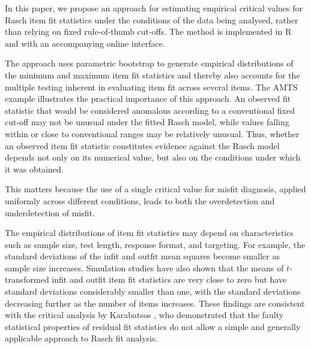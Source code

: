 \documentclass[11pt,a4paper]{article}
\begin{document}
In this paper, we propose an approach for estimating empirical critical values for Rasch item fit statistics under the conditions of the data being analysed, rather than relying on fixed rule-of-thumb cut-offs. 
The method is implemented in R and with an accompanying online interface.

The approach uses parametric bootstrap to generate empirical distributions of the minimum and maximum item fit statistics and thereby also accounts for the multiple testing inherent in evaluating item fit across several items. The AMTS example illustrates the practical importance of this approach. An observed fit statistic that would be considered anomalous according to a conventional fixed cut-off may not be unusual under the fitted Rasch model, while values falling within or close to conventional ranges may be relatively unusual. Thus, whether an observed item fit statistic constitutes evidence against the Rasch model depends not only on its numerical value, but also on the conditions under which it was obtained.

This matters because the use of a single critical value for misfit diagnosis, applied uniformly across different conditions, leads to both the overdetection and underdetection of misfit. 

The empirical distributions of item fit statistics may depend on characteristics such as sample size, test length, response format, and targeting. For example, the standard deviations of the infit and outfit mean squares become smaller as sample size increases. Simulation studies have also shown that the means of $t$-transformed infit and outfit item fit statistics are very close to zero but have standard deviations considerably smaller than one, with the standard deviations decreasing further as the number of items increases. These findings are consistent with the critical analysis by Karabatsos \cite{Karabatsos-2000}, who demonstrated that the faulty statistical properties of residual fit statistics do not allow a simple and generally applicable approach to Rasch fit analysis.
\end{document}
